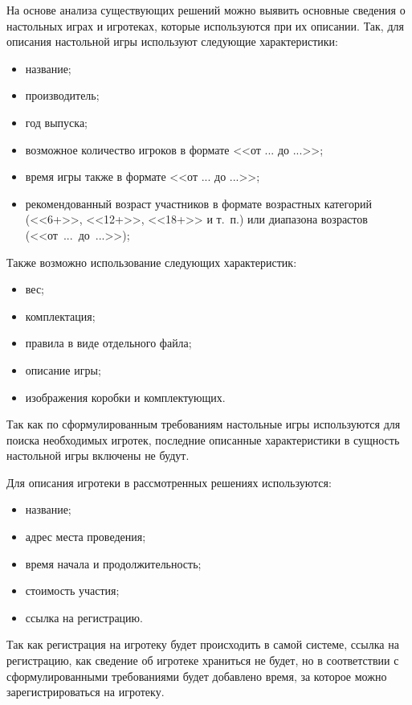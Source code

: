 На основе анализа существующих решений можно выявить основные сведения о
настольных играх и игротеках, которые используются при их описании. Так, для
описания настольной игры используют следующие характеристики:

\begin{itemize}
    \item название;
    \item производитель;
    \item год выпуска;
    \item возможное количество игроков в формате <<от ... до ...>>;
    \item время игры также в формате <<от ... до ...>>;
    \item рекомендованный возраст участников в формате возрастных категорий
        (<<6+>>, <<12+>>, <<18+>> и т.~п.) или диапазона возрастов
        (<<от~...~до~...>>);
\end{itemize}

Также возможно использование следующих характеристик:
\begin{itemize}
    \item вес;
    \item комплектация;
    \item правила в виде отдельного файла;
    \item описание игры;
    \item изображения коробки и комплектующих.
\end{itemize}

Так как по сформулированным требованиям настольные игры используются для поиска
необходимых игротек, последние описанные характеристики в сущность настольной
игры включены не будут.

\clearpage
Для описания игротеки в рассмотренных решениях используются:
\begin{itemize}
    \item название;
    \item адрес места проведения;
    \item время начала и продолжительность;
    \item стоимость участия;
    \item ссылка на регистрацию.
\end{itemize}

Так как регистрация на игротеку будет происходить в самой системе, ссылка на
регистрацию, как сведение об игротеке храниться не будет, но в соответствии с
сформулированными требованиями будет добавлено время, за которое можно
зарегистрироваться на игротеку.


